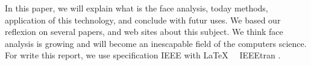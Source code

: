 In this paper, we will explain what is the face analysis, today methods, application of this technology, and conclude with futur uses. We based our reflexion on several papers, and web sites about this subject. We think face analysis is growing and will become an inescapable field of the computers science. For write this report, we use specification IEEE with \LaTeX~~ IEEEtran \cite{UseIEEE}.
